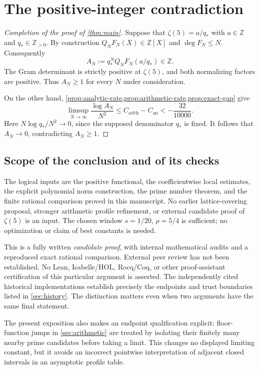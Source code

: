 \documentclass[11pt,letterpaper]{article}
\theoremstyle{definition}
\newcommand{\Z}{\mathbb Z}
\newcommand{\arith}{\mathrm{arith}}
\newcommand{\an}{\mathrm{an}}
\begin{document}

\section{The positive-integer contradiction}\label{sec:contradiction}

\begin{proof}[Completion of the proof of \cref{thm:main}]
Suppose that $\zeta(5)=a/q_*$ with $a\in\Z$ and $q_*\in\Z_{>0}$.
By construction $Q_NF_N(X)\in\Z[X]$ and $\deg F_N\le N$.
Consequently
\[
 A_N:=q_*^N Q_NF_N(a/q_*)\in\Z.
\]
The Gram determinant is strictly positive at $\zeta(5)$, and both
normalizing factors are positive. Thus $A_N\ge1$ for every $N$ under
consideration.

On the other hand, \cref{prop:analytic-rate,prop:arithmetic-rate,prop:exact-gap}
give
\[
 \limsup_{N\to\infty}\frac{\log A_N}{N^2}
 \le C_{\arith}-C_{\an}<-\frac{32}{10000}.
\]
Here $N\log q_*/N^2\to0$, since the supposed denominator $q_*$ is fixed.
It follows that $A_N\to0$, contradicting $A_N\ge1$.
\end{proof}

\subsection{Scope of the conclusion and of its checks}
The logical inputs are the positive functional, the coefficientwise
local estimates, the explicit polynomial norm construction, the prime
number theorem, and the finite rational comparison proved in this
manuscript. No earlier lattice-covering proposal, stronger arithmetic
profile refinement, or external candidate proof of $\zeta(5)$ is an input.
The chosen window $s=1/20$, $\rho=5/4$ is sufficient; no optimization or
claim of best constants is needed.

This is a fully written \emph{candidate proof}, with internal mathematical
audits and a reproduced exact rational comparison. External peer review
has not been established. No Lean, Isabelle/HOL, Rocq/Coq, or other
proof-assistant certification of this particular argument is asserted.
The independently cited historical implementations establish precisely
the endpoints and trust boundaries listed in \cref{sec:history}.
The distinction matters even when two arguments have the same final
statement.

The present exposition also makes an endpoint qualification explicit:
floor-function jumps in \cref{sec:arithmetic} are treated by isolating
their finitely many nearby prime candidates before taking a limit.
This changes no displayed limiting constant, but it avoids an incorrect
pointwise interpretation of adjacent closed intervals in an asymptotic
profile table.
\end{document}
